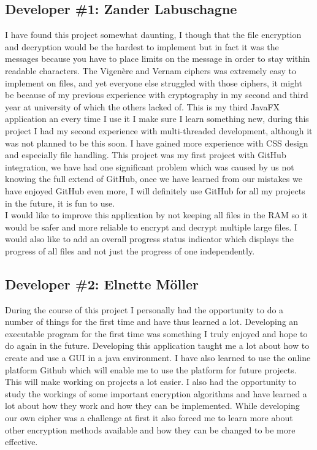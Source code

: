 \documentclass[11pt]{article}
\begin{document}
		\subsection{Developer \#1: Zander Labuschagne}
		I have found this project somewhat daunting, I though that the file encryption and decryption would be the hardest to implement but in fact it was the messages because you have to place limits on the message in order to stay within readable characters. The Vigen\`ere and Vernam ciphers was extremely easy to implement on files, and yet everyone else struggled with those ciphers, it might be because of my previous experience with cryptography in my second and third year at university of which the others lacked of. This is my third JavaFX application an every time I use it I make sure I learn something new, during this project I had my second experience with multi-threaded development, although it was not planned to be this soon. I have gained more experience with CSS design and especially file handling. This project was my first project with GitHub integration, we have had one significant problem which was caused by us not knowing the full extend of GitHub, once we have learned from our mistakes we have enjoyed GitHub even more, I will definitely use GitHub for all my projects in the future, it is fun to use.\\

		I would like to improve this application by not keeping all files in the RAM so it would be safer and more reliable to encrypt and decrypt multiple large files. I would also like to add an overall progress status indicator which displays the progress of all files and not just the progress of one independently.

		\subsection{Developer \#2: Elnette M\"oller}
		During the course of this project I personally had the opportunity to do a number of things for the first time and have thus learned a lot. Developing an executable program for the first time was something I truly enjoyed and hope to do again in the future. Developing this application taught me a lot about how to create and use a GUI in a java environment. I have also learned to use the online platform Github which will enable me to use the platform for future projects. This will make working on projects a lot easier. I also had the opportunity to study the workings of some important encryption algorithms and have learned a lot about how they work and how they can be implemented. While developing our own cipher was a challenge at first it also forced me to learn more about other encryption methods available and how they can be changed to be more effective.\\
\end{document}
